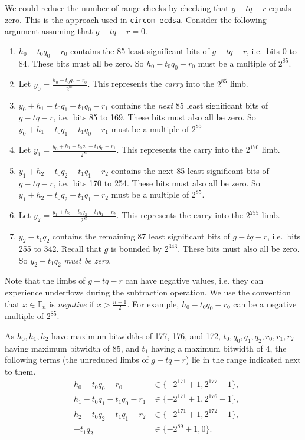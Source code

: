 \documentclass[a4paper, 12pt]{article}
\begin{document}
We could reduce the number of range checks by checking that $g-tq-r$ equals zero. This is the approach used in \texttt{circom-ecdsa}. Consider the following argument assuming that $g-tq-r = 0$.
\begin{enumerate}
  \item $h_0-t_0q_0-r_0$ contains the 85 least significant bits of $g-tq-r$, i.e.~bits 0 to 84. These bits must all be zero. So $h_0-t_0q_0-r_0$ must be a multiple of $2^{85}$. 
  \item Let $y_0 = \frac{h_0-t_0q_0-r_0}{2^{85}}$. This represents the \textit{carry} into the $2^{85}$ limb.
  \item $y_0+h_1-t_0q_1-t_1q_0-r_1$ contains the \textit{next} 85 least significant bits of $g-tq-r$, i.e.~bits 85 to 169. These bits must also all be zero. So $y_0+h_1-t_0q_1-t_1q_0-r_1$ must be a multiple of $2^{85}$
  \item Let $y_1 = \frac{y_0+h_1-t_0q_1-t_1q_0-r_1}{2^{85}}$. This represents the carry into the $2^{170}$ limb.
  \item $y_1+h_2-t_0q_2-t_1q_1-r_2$ contains the next 85 least significant bits of $g-tq-r$, i.e.~bits 170 to 254. These bits must also all be zero. So $y_1+h_2-t_0q_2-t_1q_1-r_2$ must be a multiple of $2^{85}$.
  \item Let $y_2 = \frac{y_1+h_2-t_0q_2-t_1q_1-r_2}{2^{85}}$. This represents the carry into the $2^{255}$ limb.
  \item $y_2-t_1q_2$ contains the remaining 87 least significant bits of $g-tq-r$, i.e.~bits 255 to 342. Recall that $g$ is bounded by $2^{343}$. These bits must also all be zero. So $y_2-t_1q_2$ \textit{must be zero}.
\end{enumerate}

Note that the limbs of $g-tq-r$ can have negative values, i.e. they can experience underflows during the subtraction operation. We use the convention that $x \in \mathbb{F}_n$ is \textit{negative} if $x > \frac{n-1}{2}$.  For example, $h_0-t_0q_0-r_0$ can be a negative multiple of $2^{85}$.

As $h_0, h_1, h_2$ have maximum bitwidths of 177, 176, and 172, $t_0, q_0, q_1, q_2, r_0, r_1, r_2$ having maximum bitwidth of 85, and $t_1$ having a maximum bitwidth of 4, the following terms (the unreduced limbs of $g-tq-r$) lie in the range indicated next to them.
\begin{align*}
  & h_0 - t_0q_0-r_0 & \in \{-2^{171}+1, 2^{177}-1\},\\
  & h_1 - t_0q_1-t_1q_0-r_1 & \in \{-2^{171}+1, 2^{176}-1\},\\
  & h_2 - t_0q_2-t_1q_1-r_2 & \in \{-2^{171}+1, 2^{172}-1\},\\
  & - t_1q_2 & \in \{-2^{89}+1,0\}.
\end{align*}
\end{document}
